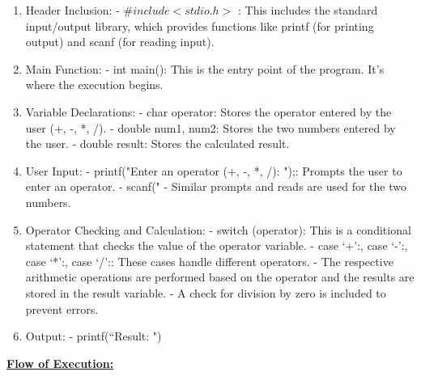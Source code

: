 \documentclass[a4paper,12pt]{article}
\begin{document}
\begin{enumerate}

\item Header Inclusion:
   - $\text{\#}include <stdio.h>$ : This includes the standard input/output library, which provides functions like printf (for printing output) and scanf (for reading input).\\

\item  Main Function:
   - int main(): This is the entry point of the program. It's where the execution begins.\\

\item Variable Declarations:
   - char operator: Stores the operator entered by the user (+, -, *, /).
   - double num1, num2: Stores the two numbers entered by the user.
   - double result: Stores the calculated result.\\

\item User Input:
   - printf("Enter an operator (+, -, *, /): ");: Prompts the user to enter an operator.
   - scanf("%
   - Similar prompts and reads are used for the two numbers.\\

\item Operator Checking and Calculation:
   - switch (operator): This is a conditional statement that checks the value of the operator variable.
   - case `+':, case `-':, case `*':, case `/':: These cases handle different operators.
   - The respective arithmetic operations are performed based on the operator and the results are stored in the result variable.
   - A check for division by zero is included to prevent errors.\\

\item Output:
   - printf(``Result: ")\\
\end{enumerate}

\begin{flushleft}
    \underline{\textbf{Flow of Execution:}}\\
\end{flushleft}
\end{document}
